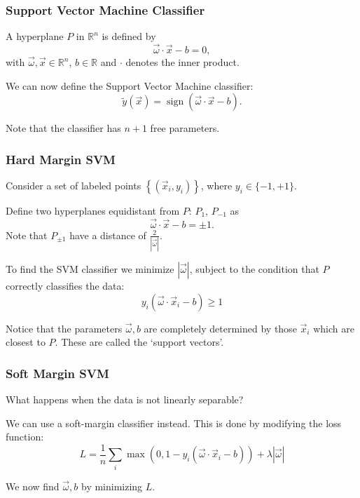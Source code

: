 \documentclass[mathserif,serif]{beamer}
\begin{document}
\begin{frame}
  \frametitle{Support Vector Machine Classifier}
  A hyperplane $P$ in $\mathbb{R}^n$ is defined by
  \begin{equation}
    \vec{\omega} \cdot \vec{x} - b = 0,
  \end{equation}
  with $\vec{\omega}, \vec{x} \in \mathbb{R}^n$, $b \in \mathbb{R}$ and $\cdot$ denotes the inner product.

  \pause
  We can now define the Support Vector Machine classifier:
  \begin{equation}
    \tilde{y}(\vec{x}) = \operatorname{sign}(\vec{\omega} \cdot \vec{x} - b).
  \end{equation}

  \pause
  Note that the classifier has $n+1$ free parameters.
\end{frame}

\begin{frame}
  \frametitle{Hard Margin SVM}
  Consider a set of labeled points $\left\{ (\vec x_i, y_i) \right\}$, where
  $y_i \in \{-1, +1\}$.

  \pause
  Define two hyperplanes equidistant from $P$: $P_1$, $P_{-1}$ as
  \begin{equation}
    \vec{\omega} \cdot \vec{x} - b = \pm 1.
  \end{equation}
  Note that $P_{\pm1}$ have a distance of $\frac{2}{|\vec{\omega}|}$.

  \pause
  To find the SVM classifier we minimize $|\vec{\omega}|$, subject to the condition that
  $P$ correctly classifies the data:
  \begin{equation}
    y_i(\vec\omega \cdot \vec x_i - b) \geq 1
  \end{equation}

  \pause
  Notice that the parameters $\vec \omega, b$ are completely determined by those
  $\vec x_i$ which are closest to $P$. These are called the `support vectors'.
\end{frame}

\begin{frame}
  \frametitle{Soft Margin SVM}
  What happens when the data is not linearly separable?

  \pause
  We can use a soft-margin classifier instead. This is done by modifying the
  loss function:
  \begin{equation}
    L = \frac 1n \sum_i \max(0, 1 - y_i(\vec\omega \cdot \vec x_i - b)) + \lambda |\vec\omega|
  \end{equation}

  \pause
  We now find $\vec\omega, b$ by minimizing $L$.
\end{frame}
\end{document}
